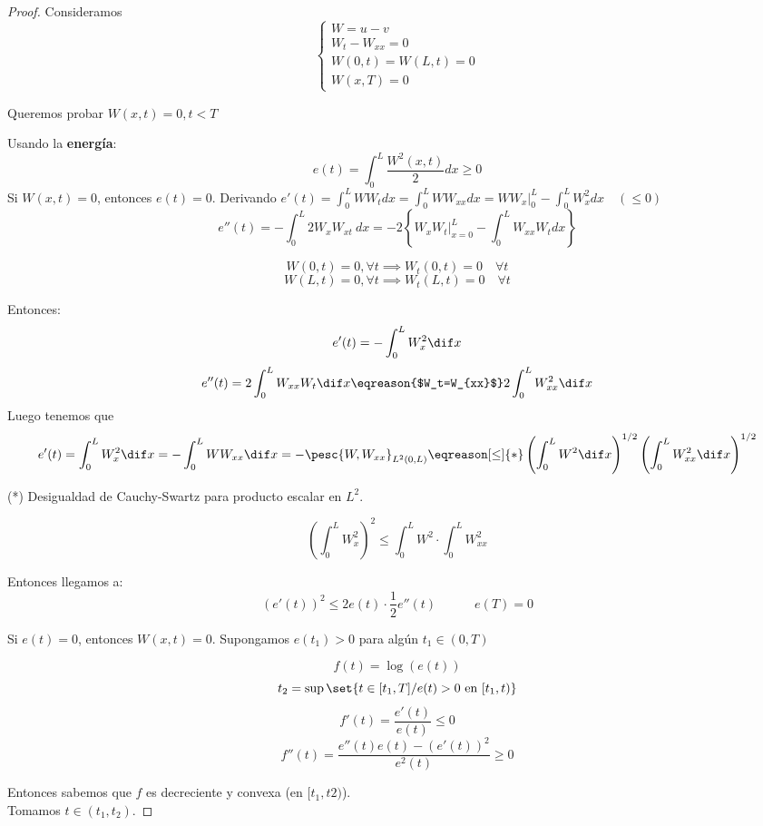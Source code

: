 		\begin{proof}
			Consideramos
			\[\begin{cases}
				W = u-v\\
				W_t - W_{xx} = 0 \\
				W(0,t) = W(L,t) = 0\\
				W(x,T) = 0
			\end{cases}\]

			Queremos probar $W(x,t) = 0, t < T$

			Usando la {\bf energía}:
			\[ e(t) = \int_0^L \frac{W^2(x,t)}{2} dx \geq 0 \]
			Si $W(x,t) = 0$, entonces $e(t) = 0$. Derivando
			\( e'(t) = \int_0^L W W_t dx = \int_0^L W W_{xx} dx = \left. W W_x \right|_0^L - \int_0^L W^2_x dx \quad (\leq 0) \)
			\[ e''(t) = - \int^L_0 2 W_x W_{xt}\ dx = -2 \left\{ \left. W_x W_t \right|^L_{x=0} - \int_0^L W_{xx} W_t dx \right\} \]

			\[W(0,t)  = 0, \forall t \implies  W_t(0,t) = 0\quad \forall t \]
			\[W(L,t)  = 0, \forall t \implies  W_t(L,t) = 0\quad \forall t \]

			Entonces:
			\[ e'(t) = - \int_0^L W^2_x \dif x \]
			\[ e''(t) = 2 \int_0^L W_{xx} W_t \dif x \eqreason{$W_t=W_{xx}$} 2 \int_0^L W_{xx}^2 \dif x \]
			Luego tenemos que
			\[ e'(t) = \int_0^L W_x^2 \dif x = - \int_0^L W W_{xx} \dif x = - \pesc{W, W_{xx}}_{L^2(0,L)} \eqreason[\leq]{*} \left(\int_0^L W^2 \dif x \right)^{1/2} \left( \int_0^L W_{xx}^2 \dif x \right)^{1/2} \]

			\obs (*) Desigualdad de Cauchy-Swartz para producto escalar en $L^2$.

			\[ \left( \int_0^L W^2_x  \right)^{2} \leq \int_0^L W^2 \cdot \int_0^L W_{xx}^2 \]

			Entonces llegamos a:
			\[ (e'(t))^2  \leq 2 e(t) \cdot \frac{1}{2} e''(t) \quad\quad\quad e(T) = 0 \]

			Si $e(t) = 0$, entonces $W(x,t) = 0$. Supongamos $e(t_1) > 0$ para algún $t_1 \in (0,T)$

			\begin{minipage}[t]{\linewidth}
			\end{minipage}

			\[f(t) = \log (e(t))\]
			\[t_2 = \sup \set{ t \in [t_1,T] / e(t) > 0 \text{ en } [t_1,t) } \]
			\[f'(t) = \frac{e'(t)}{e(t)} \leq 0\]
			\[f''(t) = \frac{e''(t) e(t)- (e'(t))^2}{e^2(t)} \geq 0\]

			Entonces sabemos que $f$ es decreciente y convexa (en $[t_1,t2)$).\\
			Tomamos $t \in ( t_1 , t_2 )$.


\end{proof}
